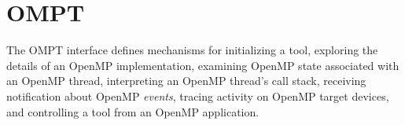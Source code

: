 %
%
%
%
%
%
%
%
%
%
%
%
%


\section{OMPT}
\label{sec:ompt-overview}

The OMPT interface defines mechanisms for initializing a tool,
exploring the details of an OpenMP implementation, examining OpenMP state
associated with an OpenMP thread, interpreting an OpenMP thread's call stack,
receiving notification about OpenMP \emph{events}, tracing activity on
OpenMP target devices, and controlling a tool from an OpenMP application.

